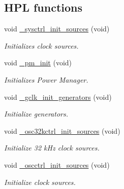 \subsection*{H\+PL functions}
\begin{DoxyCompactItemize}
\item 
\mbox{\label{group___h_p_l_ga11bde7accfa853194b32dae4f27bad40}} 
void \hyperlink{group___h_p_l_ga11bde7accfa853194b32dae4f27bad40}{\+\_\+sysctrl\+\_\+init\+\_\+sources} (void)
\begin{DoxyCompactList}\small\item\em Initializes clock sources. \end{DoxyCompactList}\item 
\mbox{\label{group___h_p_l_ga0e9b9fbf16506f0f6ad8e8b1aa87dc73}} 
void \hyperlink{group___h_p_l_ga0e9b9fbf16506f0f6ad8e8b1aa87dc73}{\+\_\+pm\+\_\+init} (void)
\begin{DoxyCompactList}\small\item\em Initializes Power Manager. \end{DoxyCompactList}\item 
\mbox{\label{group___h_p_l_ga87e8c45b05aee8f3b453630134d3483d}} 
void \hyperlink{group___h_p_l_ga87e8c45b05aee8f3b453630134d3483d}{\+\_\+gclk\+\_\+init\+\_\+generators} (void)
\begin{DoxyCompactList}\small\item\em Initialize generators. \end{DoxyCompactList}\item 
\mbox{\label{group___h_p_l_gaab304aa890beb23e3311aaa2c0def527}} 
void \hyperlink{group___h_p_l_gaab304aa890beb23e3311aaa2c0def527}{\+\_\+osc32kctrl\+\_\+init\+\_\+sources} (void)
\begin{DoxyCompactList}\small\item\em Initialize 32 k\+Hz clock sources. \end{DoxyCompactList}\item 
\mbox{\label{group___h_p_l_gaee0105b1dbc07a2ca23586aa95f49cc7}} 
void \hyperlink{group___h_p_l_gaee0105b1dbc07a2ca23586aa95f49cc7}{\+\_\+oscctrl\+\_\+init\+\_\+sources} (void)
\begin{DoxyCompactList}\small\item\em Initialize clock sources. \end{DoxyCompactList}\item 

\end{DoxyCompactItemize}
